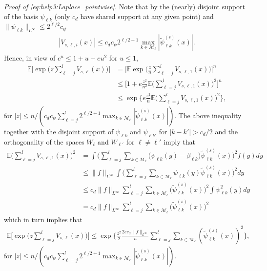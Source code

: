 \documentclass[preprint]{imsart}
\newcommand{\E}{{\mathbb E}}
\numberwithin{equation}{section}
\begin{document}
\begin{appendix}
\textit{Proof of \eqref{eq:help3:Laplace_pointwise}.} Note that by the (nearly) disjoint support of the basis $\psi_{\ell k}$ (only $c_d$ have shared support at any given point) and $\|\psi_{\ell k}\|_{L^\infty}\leq 2^{\ell/2}c_{\psi}$
\begin{align}
|V_{s,\ell,i}(x)|\leq c_dc_{\psi} 2^{\ell/2+1} \max_{k\in\mathcal{M}_{\ell}} | \tilde\psi_{\ell k}^{(s)}(x)|.\label{ub:V_i:sup}
\end{align}
Hence, in view of $e^u\leq 1+u+eu^2$ for $u\leq 1$,
\begin{align*}
\E\Big[\exp\Big( z \sum_{\ell=j}^l V_{s,\ell}(x) \Big) \Big]
&=\Big[ \E \exp\Big(  \frac{z}{n} \sum_{\ell=j}^l V_{s,\ell,1}(x) \Big)\Big]^n\\
&\leq \Big[1+e\frac{z^2}{n^2} \E\big(\sum_{\ell=j}^l  V_{s,\ell,1}(x)\big)^2\Big]^n\\
&\leq \exp\Big\{e\frac{z^2}{n} \E\big(\sum_{\ell=j}^l  V_{s,\ell,1}(x)\big)^2\Big\},
\end{align*}
for $|z|\leq  n/(c_dc_{\psi} \sum_{\ell=j}^l  2^{\ell/2+1} \max_{k\in\mathcal{M}_{\ell}} |  \tilde\psi_{\ell k}^{(s)}(x)|)$. The above inequality together with the disjoint support of $\psi_{\ell k}$ and $\psi_{\ell k'}$ for $|k-k'|>c_d/2$ and the orthogonality of the spaces $W_{\ell}$ and $W_{\ell'}$ for $\ell\neq\ell'$ imply that
\begin{align*}
 \E\big(\sum_{\ell=j}^l  V_{s,\ell,1}(x)\big)^2
&= \int \Big( \sum_{\ell=j}^l   \sum_{k\in\mathcal{M}_\ell} \big(\psi_{\ell k}(y)-\beta_{\ell k} \big)  \tilde\psi_{\ell k}^{(s)}(x)\Big)^2f(y)dy\\
&\leq \|f\|_{L^\infty} \int \Big( \sum_{\ell=j}^l   \sum_{k\in\mathcal{M}_\ell} \psi_{\ell k}(y) \tilde\psi_{\ell k}^{(s)}(x)\Big)^2dy\\
&\leq  c_d\|f\|_{L^\infty}    \sum_{\ell=j}^l   \sum_{k\in\mathcal{M}_\ell}\big(\tilde\psi_{\ell k}^{(s)}(x)\big)^2\int  \psi_{\ell k}^2(y)dy \\
&=  c_d\|f\|_{L^\infty}    \sum_{\ell=j}^l   \sum_{k\in\mathcal{M}_\ell} \big(\tilde\psi_{\ell k}^{(s)}(x)\big)^2
\end{align*}
which in turn implies that
\begin{align*}
\E\Big[\exp\Big( z \sum_{\ell=j}^l V_{s,\ell}(x) \Big) \Big]
\leq \exp\Big\{\frac{z^2}{2} \frac{2ec_d \|f\|_{L^\infty} }{n}\sum_{\ell=j}^l \sum_{k\in\mathcal{M}_\ell} (\tilde\psi_{\ell k}^{(s)}(x))^2 \Big\},
\end{align*}
for $|z|\leq  n/(c_dc_{\psi} \sum_{\ell=j}^l  2^{\ell/2+1} \max_{k\in\mathcal{M}_{\ell}} |  \tilde\psi_{\ell k}^{(s)}(x)|)$. 

\end{appendix}
\end{document}
